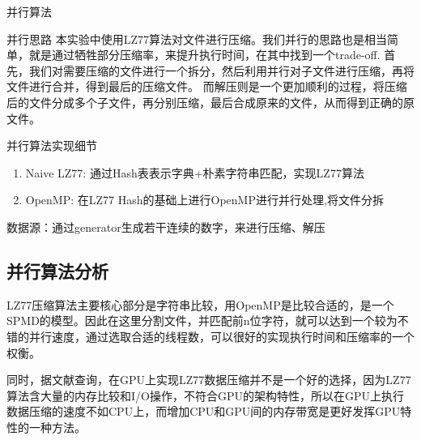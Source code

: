 \documentclass[letterpaper,12pt]{article}
\begin{document}
\begin{section}{并行算法}
	 \begin{subsection}{并行思路} 
	 \label{sub:detail}
        本实验中使用LZ77算法对文件进行压缩。我们并行的思路也是相当简单，就是通过牺牲部分压缩率，来提升执行时间，在其中找到一个trade-off. 首先，我们对需要压缩的文件进行一个拆分，然后利用并行对子文件进行压缩，再将文件进行合并，得到最后的压缩文件。
        而解压则是一个更加顺利的过程，将压缩后的文件分成多个子文件，再分别压缩，最后合成原来的文件，从而得到正确的原文件。
	 \end{subsection}
	 
	 \begin{subsection}{并行算法实现细节}
	 	\begin{enumerate}
        \item Naive LZ77: 通过Hash表表示字典+朴素字符串匹配，实现LZ77算法
        \item OpenMP: 在LZ77 Hash的基础上进行OpenMP进行并行处理,将文件分拆
    \end{enumerate}
    数据源：通过generator生成若干连续的数字，来进行压缩、解压
    \end{subsection}

    \subsection{并行算法分析}
      LZ77压缩算法主要核心部分是字符串比较，用OpenMP是比较合适的，是一个SPMD的模型。因此在这里分割文件，并匹配前n位字符，就可以达到一个较为不错的并行速度，通过选取合适的线程数，可以很好的实现执行时间和压缩率的一个权衡。\\ \par
      同时，据文献查询，在GPU上实现LZ77数据压缩并不是一个好的选择，因为LZ77算法含大量的内存比较和I/O操作，不符合GPU的架构特性，所以在GPU上执行数据压缩的速度不如CPU上，而增加CPU和GPU间的内存带宽是更好发挥GPU特性的一种方法。 

 \end{section}
\end{document}

